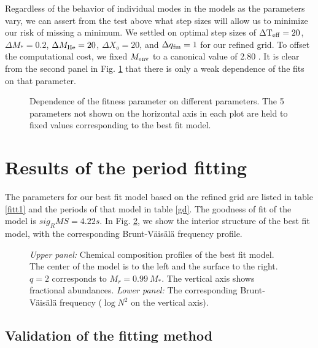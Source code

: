 \documentclass[12pt,preprint]{aastex}
\newcommand{\bvf}{Brunt-V\"ais\"al\"a }
\begin{document}
Regardless of the behavior of individual modes in the models as the parameters vary, 
we can assert from the test above what step sizes will allow us to minimize our risk 
of missing a minimum. We settled on optimal step sizes of 
$\Delta {\rm T_{eff}}=20$, $\Delta M_*=0.2$, $\Delta M_{\rm He}=20$, 
$\Delta X_o=20$, and $\Delta q_{\rm fm}=1$ for our refined grid. To offset 
the computational cost, we fixed $M_{\rm env}$ to a canonical value of 
2.80 \citep{Dehner95}. It is clear from the second panel in Fig. \ref{ffit4} 
that there is only a weak dependence of the fits on that parameter.
		
\begin{figure}
\caption{
  \label{ffit4}
Dependence of the fitness parameter on different parameters. The 5 parameters not 
shown on the horizontal axis in each plot are held to fixed values corresponding 
to the best fit model. \label{ffit4}
}
\end{figure}

\section{Results of the period fitting}

The parameters for our best fit model based on the refined grid are listed in table \ref{fitt1} and the periods of that model in table \ref{gd}. The goodness of fit of the model is $sig_RMS = 4.22 s$. In Fig. \ref{ffit1}, we show the interior structure of the best fit model, with the corresponding \bvf frequency profile.

\begin{figure}
\caption{
{\em Upper panel:} Chemical composition profiles of the best fit model. The center of the model is to the left and the surface to the right.  $q=2$ corresponds to $M_r = 0.99 \: M_*$. The vertical axis shows fractional abundances. 
{\em Lower panel:} The corresponding \bvf frequency ($\log{N^2}$ on the vertical axis). \label{ffit1}
}
\end{figure}

\subsection{Validation of the fitting method}
\end{document}
